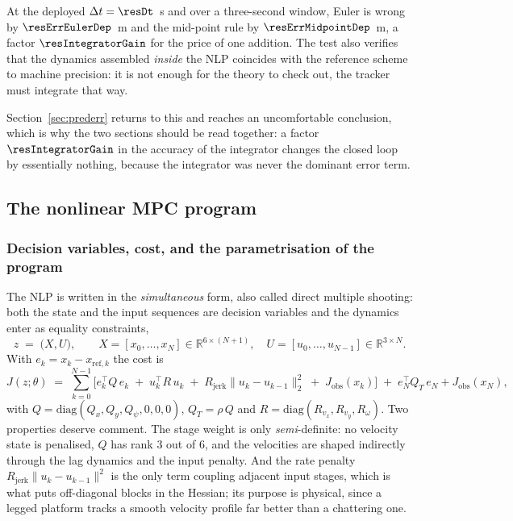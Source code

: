 \documentclass[11pt,a4paper]{article}
\newcommand{\R}{\mathbb{R}}
\newcommand{\Jobs}{J_{\mathrm{obs}}}
\newcommand{\Rjerk}{R_{\mathrm{jerk}}}
\begin{document}

At the deployed $\Delta t=\resDt$~s and over a three-second window, Euler is wrong by
$\resErrEulerDep$~m and the mid-point rule by $\resErrMidpointDep$~m, a factor $\resIntegratorGain$ for the
price of one addition. The test also verifies that the dynamics assembled \emph{inside} the NLP coincides
with the reference scheme to machine precision: it is not enough for the theory to check out, the tracker
must integrate that way.

Section~\ref{sec:prederr} returns to this and reaches an uncomfortable conclusion, which is why the two
sections should be read together: a factor $\resIntegratorGain$ in the accuracy of the integrator changes the
closed loop by essentially nothing, because the integrator was never the dominant error term.

\subsection{The nonlinear MPC program}
\label{sec:nlp}

\subsubsection{Decision variables, cost, and the parametrisation of the program}
\label{sec:shoot}

The NLP is written in the \emph{simultaneous} form, also called direct multiple shooting: both the state and
the input sequences are decision variables and the dynamics enter as equality constraints,
\begin{equation}
  z \;=\; \big(X,U\big),\qquad X=[x_0,\dots,x_N]\in\R^{6\times(N+1)},\quad U=[u_0,\dots,u_{N-1}]\in\R^{3\times N}.
\end{equation}
With $e_k=x_k-x_{\mathrm{ref},k}$ the cost is
\begin{equation}
  J(z;\theta) \;=\;
  \sum_{k=0}^{N-1}\Big[e_k^{\!\top} Q\, e_k
  \;+\; u_k^{\!\top} R\, u_k
  \;+\; \Rjerk\|u_k-u_{k-1}\|_2^2
  \;+\; \Jobs(x_k)\Big]
  \;+\;e_N^{\!\top} Q_T\, e_N + \Jobs(x_N),
  \label{eq:cost}
\end{equation}
with $Q=\mathrm{diag}(Q_x,Q_y,Q_\psi,0,0,0)$, $Q_T=\rho\,Q$ and $R=\mathrm{diag}(R_{v_x},R_{v_y},R_\omega)$.
Two properties deserve comment. The stage weight is only \emph{semi}-definite: no velocity state is
penalised, $Q$ has rank $3$ out of $6$, and the velocities are shaped indirectly through the lag dynamics and
the input penalty. And the rate penalty $\Rjerk\|u_k-u_{k-1}\|^2$ is the only term coupling adjacent input
stages, which is what puts off-diagonal blocks in the Hessian; its purpose is physical, since a legged
platform tracks a smooth velocity profile far better than a chattering one.
\end{document}

